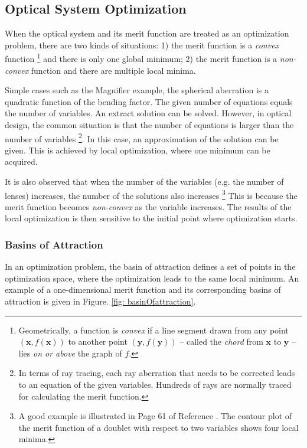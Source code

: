 \subsection{Optical System Optimization }
\vspace{1em}
When the optical system and its merit function are treated as an optimization problem, there are two kinds of situations: 1) the merit function is a \textit{convex} function \footnote{Geometrically, a function is \textit{convex} if a line segment drawn from any point $(\pmb{x}, f(\pmb{x}))$ to another point $(\pmb{y}, f(\pmb{y}))$ -- called the \textit{chord} from $\pmb{x}$ to $\pmb{y}$ -- lies \textit{on or above} the graph of $f$.} and there is only one global minimum; 2) the merit function is a \textit{non-convex} function and there are multiple local minima. 

Simple cases such as the Magnifier example, the spherical aberration is a quadratic function of the bending factor.  The given number of equations equals the number of variables. An extract solution can be solved. However, in optical design, the common situation is that the number of equations is larger than the number of variables \footnote{In terms of ray tracing, each ray aberration that needs to be corrected leads to an equation of the given variables. Hundreds of rays are normally traced for calculating the merit function.}. In this case, an approximation of the solution can be given. This is achieved by local optimization, where one minimum can be acquired. 

It is also observed that when the number of the variables (e.g. the number of lenses) increases, the number of the solutions also increases \footnote{A good example is illustrated in Page 61 of Reference \cite{vanTurnhoutThesis2009}. The contour plot of the merit function of a doublet with respect to two variables shows four local minima.} This is because the merit function becomes \textit{non-convex} as the variable increases. The results of the local optimization is then sensitive to the initial point where optimization starts.  

\subsubsection{Basins of Attraction \label{label: basinOfattrac}}
\vspace{1em}
In an optimization problem, the basin of attraction defines a set of points in the optimization space, where the optimization leads to the same local minimum. An example of a one-dimensional merit function and its corresponding basins of attraction is given in Figure. \ref{fig: basinOfattraction}. 

